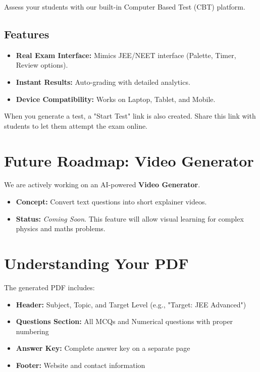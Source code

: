 \documentclass[11pt,a4paper]{article}
\begin{document}
Assess your students with our built-in Computer Based Test (CBT) platform.

\subsection{Features}
\begin{itemize}[leftmargin=*]
    \item \textbf{Real Exam Interface:} Mimics JEE/NEET interface (Palette, Timer, Review options).
    \item \textbf{Instant Results:} Auto-grading with detailed analytics.
    \item \textbf{Device Compatibility:} Works on Laptop, Tablet, and Mobile.
\end{itemize}

\begin{tcolorbox}[notebox]
When you generate a test, a "Start Test" link is also created. Share this link with students to let them attempt the exam online.
\end{tcolorbox}

\section{Future Roadmap: Video Generator}

We are actively working on an AI-powered \textbf{Video Generator}.
\begin{itemize}
    \item \textbf{Concept:} Convert text questions into short explainer videos.
    \item \textbf{Status:} \textit{Coming Soon}. This feature will allow visual learning for complex physics and maths problems.
\end{itemize}

\section{Understanding Your PDF}

The generated PDF includes:

\begin{itemize}[leftmargin=*]
    \item \textbf{Header:} Subject, Topic, and Target Level (e.g., "Target: JEE Advanced")
    \item \textbf{Questions Section:} All MCQs and Numerical questions with proper numbering
    \item \textbf{Answer Key:} Complete answer key on a separate page
    \item \textbf{Footer:} Website and contact information
\end{itemize}
\end{document}
